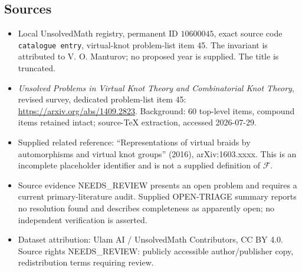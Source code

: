 \documentclass[11pt]{article}
\begin{document}
\subsection{Sources}
\begin{itemize}
\item Local UnsolvedMath registry, permanent ID \(10600045\), exact source code \texttt{catalogue entry}, virtual-knot problem-list item 45. The invariant is attributed to V. O. Manturov; no proposed year is supplied. The title is truncated.
\item \emph{Unsolved Problems in Virtual Knot Theory and Combinatorial Knot Theory}, revised survey, dedicated problem-list item 45: \url{https://arxiv.org/abs/1409.2823}. Background: 60 top-level items, compound items retained intact; source-TeX extraction, accessed 2026-07-29.
\item Supplied related reference: ``Representations of virtual braids by automorphisms and virtual knot groups'' (2016), arXiv:1603.xxxx. This is an incomplete placeholder identifier and is not a supplied definition of \(\mathcal F\).
\item Source evidence NEEDS\_REVIEW presents an open problem and requires a current primary-literature audit. Supplied OPEN-TRIAGE summary reports no resolution found and describes completeness as apparently open; no independent verification is asserted.
\item Dataset attribution: Ulam AI / UnsolvedMath Contributors, CC BY 4.0. Source rights NEEDS\_REVIEW: publicly accessible author/publisher copy, redistribution terms requiring review.
\end{itemize}
\end{document}
